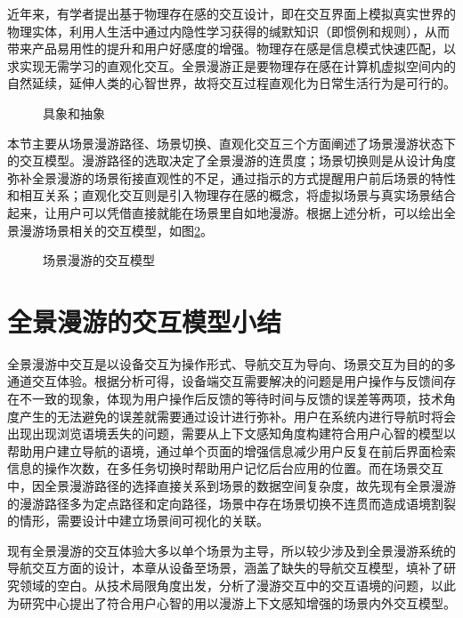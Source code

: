 近年来，有学者提出基于物理存在感的交互设计，即在交互界面上模拟真实世界的物理实体，利用人生活中通过内隐性学习获得的缄默知识（即惯例和规则），从而带来产品易用性的提升和用户好感度的增强。物理存在感是信息模式快速匹配，以求实现无需学习的直观化交互。全景漫游正是要物理存在感在计算机虚拟空间内的自然延续，延伸人类的心智世界，故将交互过程直观化为日常生活行为是可行的。

\begin{figure}[htp]
\centering
{}
\caption{具象和抽象}
\label{fig:wysiwyg}
\end{figure}

本节主要从场景漫游路径、场景切换、直观化交互三个方面阐述了场景漫游状态下的交互模型。漫游路径的选取决定了全景漫游的连贯度；场景切换则是从设计角度弥补全景漫游的场景衔接直观性的不足，通过指示的方式提醒用户前后场景的特性和相互关系；直观化交互则是引入物理存在感的概念，将虚拟场景与真实场景结合起来，让用户可以凭借直接就能在场景里自如地漫游。根据上述分析，可以绘出全景漫游场景相关的交互模型，如图\ref{fig:vr}。

\begin{figure}[htp]
\centering
\fbox{
\texttt{[image: vr]}
}
\caption{场景漫游的交互模型}
\label{fig:vr}
\end{figure}

\section{全景漫游的交互模型小结}
全景漫游中交互是以设备交互为操作形式、导航交互为导向、场景交互为目的的多通道交互体验。根据分析可得，设备端交互需要解决的问题是用户操作与反馈间存在不一致的现象，体现为用户操作后反馈的等待时间与反馈的误差等两项，技术角度产生的无法避免的误差就需要通过设计进行弥补。用户在系统内进行导航时将会出现出现浏览语境丢失的问题，需要从上下文感知角度构建符合用户心智的模型以帮助用户建立导航的语境，通过单个页面的增强信息减少用户反复在前后界面检索信息的操作次数，在多任务切换时帮助用户记忆后台应用的位置。而在场景交互中，因全景漫游路径的选择直接关系到场景的数据空间复杂度，故先现有全景漫游的漫游路径多为定点路径和定向路径，场景中存在场景切换不连贯而造成语境割裂的情形，需要设计中建立场景间可视化的关联。

现有全景漫游的交互体验大多以单个场景为主导，所以较少涉及到全景漫游系统的导航交互方面的设计，本章从设备至场景，涵盖了缺失的导航交互模型，填补了研究领域的空白。从技术局限角度出发，分析了漫游交互中的交互语境的问题，以此为研究中心提出了符合用户心智的用以漫游上下文感知增强的场景内外交互模型。